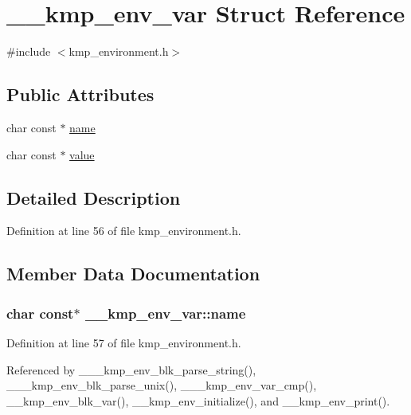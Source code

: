 \hypertarget{struct____kmp__env__var}{\section{\-\_\-\-\_\-kmp\-\_\-env\-\_\-var Struct Reference}
\label{struct____kmp__env__var}
}


{\ttfamily \#include $<$kmp\-\_\-environment.\-h$>$}

\subsection*{Public Attributes}
\begin{DoxyCompactItemize}
\item 
char const $\ast$ \hyperlink{struct____kmp__env__var_a439c7b2401d48121f1f02c19cad675dc}{name}
\item 
char const $\ast$ \hyperlink{struct____kmp__env__var_aab9326e41f54696bffe90343f68780e9}{value}
\end{DoxyCompactItemize}


\subsection{Detailed Description}


Definition at line 56 of file kmp\-\_\-environment.\-h.



\subsection{Member Data Documentation}
\hypertarget{struct____kmp__env__var_a439c7b2401d48121f1f02c19cad675dc}{
\subsubsection[{name}]{\setlength{\rightskip}{0pt plus 5cm}char const$\ast$ \-\_\-\-\_\-kmp\-\_\-env\-\_\-var\-::name}}\label{struct____kmp__env__var_a439c7b2401d48121f1f02c19cad675dc}


Definition at line 57 of file kmp\-\_\-environment.\-h.



Referenced by \-\_\-\-\_\-\-\_\-kmp\-\_\-env\-\_\-blk\-\_\-parse\-\_\-string(), \-\_\-\-\_\-\-\_\-kmp\-\_\-env\-\_\-blk\-\_\-parse\-\_\-unix(), \-\_\-\-\_\-\-\_\-kmp\-\_\-env\-\_\-var\-\_\-cmp(), \-\_\-\-\_\-kmp\-\_\-env\-\_\-blk\-\_\-var(), \-\_\-\-\_\-kmp\-\_\-env\-\_\-initialize(), and \-\_\-\-\_\-kmp\-\_\-env\-\_\-print().

